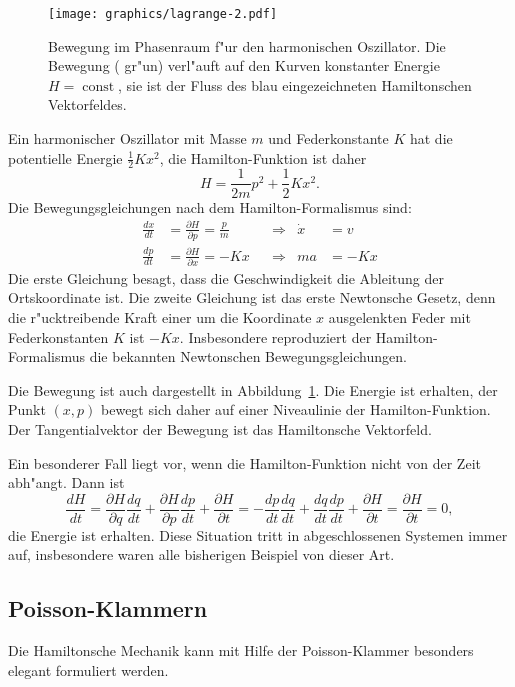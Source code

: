 \begin{beispiel}
\begin{figure}
\centering
\texttt{[image: graphics/lagrange-2.pdf]}
\caption{Bewegung im Phasenraum f"ur den harmonischen Oszillator.
Die Bewegung ({\color{green} gr"un}) verl"auft auf den Kurven konstanter
Energie $H=\operatorname{const}$, sie ist der Fluss des blau eingezeichneten
Hamiltonschen Vektorfeldes.
\label{skript:hamilton-harmonisch}}
\end{figure}
Ein harmonischer Oszillator
mit Masse $m$ und Federkonstante $K$ hat die potentielle Energie $\frac12Kx^2$,
die Hamilton-Funktion ist daher
\[
H=\frac1{2m}p^2+\frac12Kx^2.
\]
Die Bewegungsgleichungen nach dem Hamilton-Formalismus sind:
\begin{align*}
\frac{dx}{dt}&=\frac{\partial H}{\partial p}=\frac{p}{m}&&\Rightarrow&\dot x&=v\\
\frac{dp}{dt}&=\frac{\partial H}{\partial x}=-Kx&&\Rightarrow&ma&=-Kx
\end{align*}
Die erste Gleichung besagt, dass die Geschwindigkeit die Ableitung
der Ortskoordinate ist.
Die zweite Gleichung ist das erste Newtonsche Gesetz, denn die
r"ucktreibende Kraft einer um die Koordinate $x$ ausgelenkten Feder
mit Federkonstanten $K$ ist $-Kx$.
Insbesondere reproduziert der Hamilton-Formalismus die bekannten
Newtonschen Bewegungsgleichungen.

Die Bewegung ist auch dargestellt in Abbildung~\ref{skript:hamilton-harmonisch}.
Die Energie ist erhalten, der Punkt $(x,p)$ bewegt sich daher
auf einer Niveaulinie der Hamilton-Funktion.
Der Tangentialvektor der Bewegung ist das Hamiltonsche Vektorfeld.
\end{beispiel}

Ein besonderer Fall liegt vor, wenn die Hamilton-Funktion nicht von
der Zeit abh"angt. Dann ist
\[
\frac{dH}{dt}
=
\frac{\partial H}{\partial q}\frac{dq}{dt}
+
\frac{\partial H}{\partial p}\frac{dp}{dt}
+
\frac{\partial H}{\partial t}
=
-\frac{dp}{dt}\frac{dq}{dt}
+
\frac{dq}{dt}\frac{dp}{dt}
+
\frac{\partial H}{\partial t}
=
\frac{\partial H}{\partial t}=0,
\]
die Energie ist erhalten. Diese Situation tritt in abgeschlossenen
Systemen immer auf, insbesondere waren alle bisherigen Beispiel
von dieser Art.

\subsection{Poisson-Klammern}
Die Hamiltonsche Mechanik kann mit Hilfe der Poisson-Klammer besonders
elegant formuliert werden.

